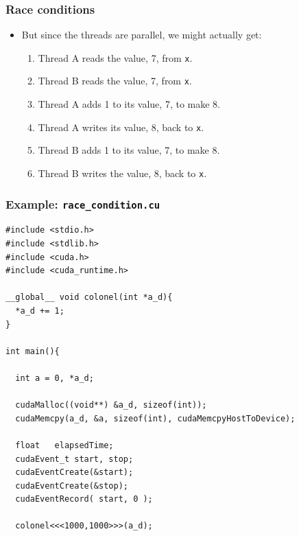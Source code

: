 \documentclass[handout]{beamer}
\numberwithin{equation}{section}
\begin{document}
\begin{frame}
\frametitle{Race conditions}
\begin{itemize}
\item But since the threads are parallel, we might actually get:
\begin{enumerate}
\pause \item Thread A reads the value, 7, from {\tt *x}.
\pause \item Thread B reads the value, 7, from {\tt *x}.
\pause \item Thread A adds 1 to its value, 7, to make 8.
\pause \item Thread A writes its value, 8, back to {\tt *x}.
\pause \item Thread B adds 1 to its value, 7, to make 8.
\pause \item Thread B writes the value, 8, back to {\tt *x}.
\end{enumerate}
\end{itemize}
\end{frame}


\begin{frame}[fragile]
\frametitle{Example: {\tt race\_condition.cu}} \lstset{basicstyle=\tiny}
\begin{lstlisting}[name=racecon]
#include <stdio.h>
#include <stdlib.h>
#include <cuda.h>
#include <cuda_runtime.h> 

__global__ void colonel(int *a_d){
  *a_d += 1;
}

int main(){

  int a = 0, *a_d;
  
  cudaMalloc((void**) &a_d, sizeof(int));
  cudaMemcpy(a_d, &a, sizeof(int), cudaMemcpyHostToDevice);

  float   elapsedTime;
  cudaEvent_t start, stop;
  cudaEventCreate(&start);
  cudaEventCreate(&stop);
  cudaEventRecord( start, 0 );
  
  colonel<<<1000,1000>>>(a_d); 
\end{lstlisting}
\end{frame}
\end{document}
